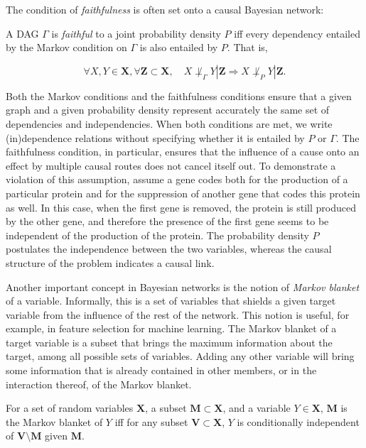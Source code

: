 The condition of \emph{faithfulness} is often set onto a causal Bayesian
network:

\begin{definition}[Faithfulness]
\label{def:faith}

A DAG $\Gamma$ is \emph{faithful} to a joint probability density $P$ iff every
dependency entailed by the Markov condition on $\Gamma$ is also
entailed by $P$. That is,

\begin{equation}
\forall X, Y\in\bm X,\forall \bm Z\subset\bm X,\quad
X\not\perp_\Gamma Y|\bm Z\Rightarrow X\not\perp_P Y|\bm Z.
\end{equation}

\end{definition}

Both the Markov conditions and the faithfulness conditions ensure that a given
graph and a given probability density represent accurately the same set of
dependencies and independencies. When both conditions are met, we write
(in)dependence relations without specifying whether it is entailed by $P$ or
$\Gamma$. The faithfulness condition, in particular, ensures that the influence
of a cause onto an effect by multiple causal routes does not cancel itself out.
To demonstrate a violation of this assumption, assume a gene codes both
for the production of a particular protein and for the suppression of another
gene that codes this protein as well. In this case, when the first gene is
removed, the protein is still produced by the other gene, and therefore the
presence of the first gene seems to be independent of the production of the
protein. The probability density $P$ postulates the independence between the two
variables, whereas the causal structure of the problem indicates a causal
link\parencite{hitchcock1997probabilistic}.

Another important concept in Bayesian networks is the notion of \emph{Markov
blanket} of a variable. Informally, this is a set of variables that shields a
given target variable from the influence of the rest of the network. This notion
is useful, for example, in feature selection for machine learning. The Markov
blanket of a target variable is a subset that brings the maximum information
about the target, among all possible sets of variables. Adding any other
variable will bring some information that is already contained in other members,
or in the interaction thereof, of the Markov blanket.

\begin{definition}

For a set of random variables $\bm X$, a subset $\bm M\subset\bm X$, and a
variable $Y\in\bm X$, $\bm M$ is the Markov blanket of $Y$ iff for any subset
$\bm V\subset\bm X$, $Y$ is conditionally independent of $\bm V\setminus \bm M$
given $\bm M$.

\end{definition}

